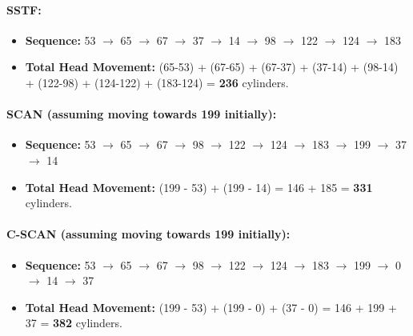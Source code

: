 \documentclass[12pt]{article}
\begin{document}
\paragraph{SSTF:}
\begin{itemize}
    \item \textbf{Sequence:} 53 \(\rightarrow\) 65 \(\rightarrow\) 67 \(\rightarrow\) 37 \(\rightarrow\) 14 \(\rightarrow\) 98 \(\rightarrow\) 122 \(\rightarrow\) 124 \(\rightarrow\) 183
    \item \textbf{Total Head Movement:} (65-53) + (67-65) + (67-37) + (37-14) + (98-14) + (122-98) + (124-122) + (183-124) = \textbf{236} cylinders.
\end{itemize}

\paragraph{SCAN (assuming moving towards 199 initially):}
\begin{itemize}
    \item \textbf{Sequence:} 53 \(\rightarrow\) 65 \(\rightarrow\) 67 \(\rightarrow\) 98 \(\rightarrow\) 122 \(\rightarrow\) 124 \(\rightarrow\) 183 \(\rightarrow\) 199 \(\rightarrow\) 37 \(\rightarrow\) 14
    \item \textbf{Total Head Movement:} (199 - 53) + (199 - 14) = 146 + 185 = \textbf{331} cylinders.
\end{itemize}

\paragraph{C-SCAN (assuming moving towards 199 initially):}
\begin{itemize}
    \item \textbf{Sequence:} 53 \(\rightarrow\) 65 \(\rightarrow\) 67 \(\rightarrow\) 98 \(\rightarrow\) 122 \(\rightarrow\) 124 \(\rightarrow\) 183 \(\rightarrow\) 199 \(\rightarrow\) 0 \(\rightarrow\) 14 \(\rightarrow\) 37
    \item \textbf{Total Head Movement:} (199 - 53) + (199 - 0) + (37 - 0) = 146 + 199 + 37 = \textbf{382} cylinders.
\end{itemize}

\end{document}
